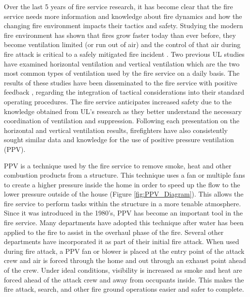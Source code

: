\documentclass{article}
\begin{document}
Over the last 5 years of fire service research, it has become clear that the fire service needs more information and knowledge about fire dynamics and how the changing fire environment impacts their tactics and safety. Studying the modern fire environment has shown that fires grow faster today than ever before, they become ventilation limited (or run out of air) and the control of that air during fire attack is critical to a safely mitigated fire incident \cite{ChangingResdFires_Kerber}. Two previous UL studies have examined horizontal ventilation \cite{One_Two_Family_Fires_Kerber} and vertical ventilation \cite{UL_VerticalVent} which are the two most common types of ventilation used by the fire service on a daily basis. The results of these studies have been disseminated to the fire service with positive feedback \cite{HowToKeepFirefighterSafer_Goldfeder}, \cite{SurbarbanFirefighting_Knapp} regarding the integration of tactical considerations into their standard operating procedures. The fire service anticipates increased safety due to the knowledge obtained from UL’s research as they better understand the necessary coordination of ventilation and suppression. Following each presentation on the horizontal and vertical ventilation results, firefighters have also consistently sought similar data and knowledge for the use of positive pressure ventilation (PPV). 

PPV is a technique used by the fire service to remove smoke, heat and other combustion products from a structure. This technique uses a fan or multiple fans to create a higher pressure inside the home in order to speed up the flow to the lower pressure outside of the house (Figure \ref{fig:PPV_Diagram}). This allows the fire service to perform tasks within the structure in a more tenable atmosphere. Since it was introduced in the 1980’s, PPV has become an important tool in the fire service. Many departments have adopted this technique after water has been applied to the fire to assist in the overhaul phase of the fire. Several other departments have incorporated it as part of their initial fire attack. When used during fire attack, a PPV fan or blower is placed at the entry point of the attack crew and air is forced through the home and out through an exhaust point ahead of the crew. Under ideal conditions, visibility is increased as smoke and heat are forced ahead of the attack crew and away from occupants inside. This makes the fire attack, search, and other fire ground operations easier and safer to complete.
\end{document}
